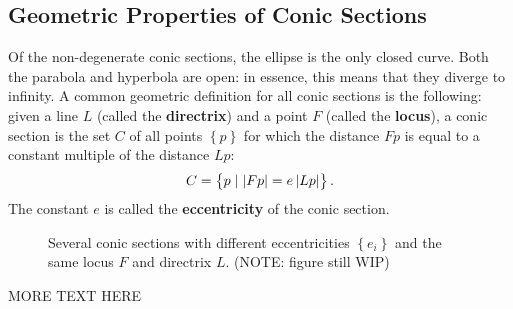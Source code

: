 \subsection{Geometric Properties of Conic Sections}
Of the non-degenerate conic sections, the ellipse is the only closed curve. Both the parabola and hyperbola are open: in essence, this means that they diverge to infinity. A common geometric definition for all conic sections is the following: given a line $L$ (called the \textbf{directrix}) and a point $F$ (called the \textbf{locus}), a conic section is the set $C$ of all points $\left\{p\right\}$ for which the distance $Fp$ is equal to a constant multiple of the distance $Lp$:
\begin{equation}
	C = \left\{ p \mid \left| Fp \right| = e\left| Lp \right| \right\}.
	\label{eq:conic_section_geometric_definition}
\end{equation}
The constant $e$ is called the \textbf{eccentricity} of the conic section.

\begin{figure}
	\begin{center}
	\end{center}
	\caption{Several conic sections with different eccentricities $\left\{e_{i}\right\}$ and the same locus $F$ and directrix $L$. (NOTE: figure still WIP)}
	\label{fig:conic_sections_geometrically}
\end{figure}

MORE TEXT HERE

